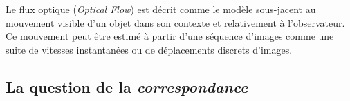 \documentclass[a4paper,12pt]{report}
\begin{document}
	Le flux optique (\textit{Optical Flow}) est décrit comme le modèle sous-jacent au mouvement visible d'un objet dans son contexte et relativement à l'observateur. Ce mouvement peut être estimé à partir d'une séquence d'images comme une suite de vitesses instantanées ou de déplacements discrets d'images.\\ 
	
	

\subsection{La question de la \textit{correspondance}}
\end{document}

